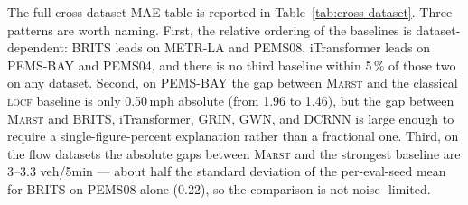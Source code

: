 \documentclass[11pt]{article}
\newcommand{\MARST}{\textsc{Marst}\xspace}
\newcommand{\LOCF}{\textsc{locf}\xspace}
\begin{document}
The full cross-dataset MAE table is reported in
Table~\ref{tab:cross-dataset}.  Three patterns are worth naming.
First, the relative ordering of the baselines is dataset-dependent:
BRITS leads on METR-LA and PEMS08, iTransformer leads on PEMS-BAY and
PEMS04, and there is no third baseline within 5\,\% of those two on
any dataset.  Second, on PEMS-BAY the gap between \MARST and the
classical \LOCF baseline is only 0.50\,mph absolute (from 1.96 to
1.46), but the gap between \MARST and BRITS, iTransformer, GRIN, GWN,
and DCRNN is large enough to require a single-figure-percent
explanation rather than a fractional one.  Third, on the flow datasets
the absolute gaps between \MARST and the strongest baseline are 3--3.3
veh/5min --- about half the standard deviation of the per-eval-seed
mean for BRITS on PEMS08 alone (0.22), so the comparison is not noise-
limited.
\end{document}
